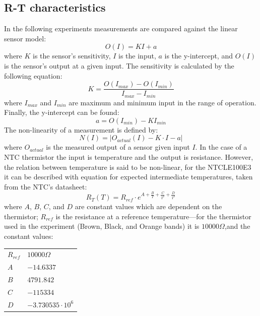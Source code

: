 \documentclass[a4,11pt]{article}
\begin{document}
\subsection{R-T characteristics}
In the following experiments measurements are compared against the linear sensor model:
\begin{equation}
  \label{eq:model}
  O(I)=KI+a
\end{equation}
where $K$ is the sensor's sensitivity, $I$ is the input, $a$ is the y-intercept, and $O(I)$ is the sensor's output at a given input. The sensitivity is calculated by the following equation:
\begin{equation}
  \label{eq:sensitivity}
  K=\frac{O(I_{max})-O(I_{min})}{I_{max}-I_{min}}
\end{equation}
where $I_{max}$ and $I_{min}$ are maximum and minimum input in the range of operation. Finally, the  y-intercept can be found:
\begin{equation}
  \label{eq:intercept}
  a=O(I_{min})-KI_{min}
\end{equation}
The non-linearity of a measurement is defined by:
\begin{equation}
  \label{eq:non-linearity}
  N(I)=\lvert O_{actual}(I)-K\cdot I-a\lvert
\end{equation}
where $O_{actual}$ is the measured output of a sensor given input $I$.
In the case of a NTC thermistor the input is temperature and the output is resistance. However, the relation between temperature is said to be non-linear, for the NTCLE100E3 it can be described with equation for expected intermediate temperatures, taken from the NTC's datasheet:
\begin{equation}
  \label{eq:datasheet}
  R_T(T)=R_{ref}\cdot e^{A+\frac{B}{T}+\frac{C}{T^2}+\frac{D}{T^3}}
\end{equation}
where $A$, $B$, $C$, and $D$ are constant values which are dependent on the thermistor; $R_{ref}$ is the resistance at a reference temperature---for the thermistor used in the experiment (Brown, Black, and Orange bands) it is $10000\Omega$,and the constant values:
\begin{center}
  \begin{tabular}{ll}
    \hline 
    $R_{ref}$  &  $10000\Omega$  \\
    $A$  &  $-14.6337$  \\
    $B$\footnotemark  &  $4791.842$  \\
    $C$  &  $-115334$  \\
    $D$  &  $-3.730535\cdot10^6$  \\
    \hline
  \end{tabular}
\end{center}
\end{document}
